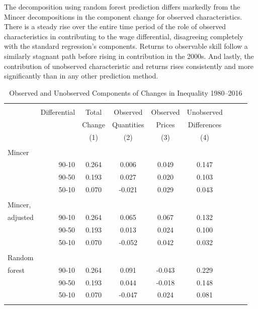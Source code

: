 \documentclass[notitlepage,12pt]{article}
\begin{document}
The decomposition using random forest prediction differs markedly from the Mincer decompositions in the component change for observed characteristics.  There is a steady rise over the entire time period of the role of observed characteristics in contributing to the wage differential, disagreeing completely with the standard regression's components.  Returns to observable skill follow a similarly stagnant path before rising in contribution in the 2000s.  And lastly, the contribution of unobserved characteristic and returns rises consistently and more significantly than in any other prediction method.
\begin{table}[h]
\centering
\caption{Observed and Unobserved Components of Changes in Inequality 1980--2016}
\begin{tabular}{@{\extracolsep{5pt}}lr|ccccccc} 
\\[-1.8ex]\hline 
\hline \\[-1.8ex] 
 & Differential & Total & Observed & Observed & Unobserved  \\
  & & Change & Quantities & Prices & Differences  \\
 & & (1) & (2) & (3) & (4) \\
\hline \hline \\[-1.8ex] 
 Mincer & \\
 & 90-10 &  0.264 & 0.006 & 0.049 &  0.147 \\ 
   & 90-50 &  0.193 & 0.027 & 0.020 &  0.103 \\ 
   & 50-10 &  0.070 &  -0.021 & 0.029 &  0.043 \\
  \\[-1.8ex] \hline
 Mincer, & \\
 adjusted &  90-10 &  0.264 &  0.065 & 0.067 &  0.132 \\ 
   & 90-50 &  0.193 &  0.013 & 0.024 &  0.100 \\ 
   & 50-10 &  0.070 &  -0.052 & 0.042 &  0.032 \\
 \\[-1.8ex] \hline
 Random & \\ 
 forest & 90-10 &  0.264 &  0.091 & -0.043 &  0.229 \\ 
  & 90-50 &  0.193 &  0.044 & -0.018 &  0.148 \\ 
  & 50-10 &  0.070 &  -0.047 & 0.024 &  0.081 \\
\hline 
\hline  \\[-1.8ex] 
\end{tabular} 
\end{table}
\end{document}
